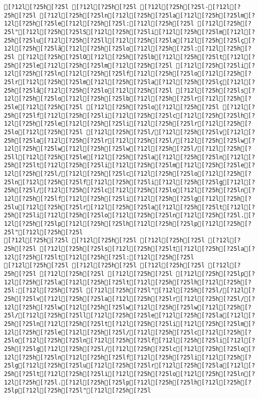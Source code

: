 \documentclass{scrartcl}
\begin{document}
\begin{Verbatim}
[?12l[?25h[?25l [?12l[?25h[?25l [?12l[?25h[?25l-[?12l[?25h[?25l [?12l[?25h[?25ln[?12l[?25h[?25la[?12l[?25h[?25lm[?12l[?25h[?25le[?12l[?25h[?25l:[?12l[?25h[?25l [?12l[?25h[?25l"[?12l[?25h[?25lS[?12l[?25h[?25li[?12l[?25h[?25lm[?12l[?25h[?25lu[?12l[?25h[?25ll[?12l[?25h[?25la[?12l[?25h[?25lç[?12l[?25h[?25lã[?12l[?25h[?25lo[?12l[?25h[?25l:[?12l[?25h[?25l [?12l[?25h[?25lO[?12l[?25h[?25lb[?12l[?25h[?25lt[?12l[?25h[?25le[?12l[?25h[?25lm[?12l[?25h[?25l [?12l[?25h[?25li[?12l[?25h[?25ln[?12l[?25h[?25lf[?12l[?25h[?25lo[?12l[?25h[?25lr[?12l[?25h[?25lm[?12l[?25h[?25la[?12l[?25h[?25lç[?12l[?25h[?25lã[?12l[?25h[?25lo[?12l[?25h[?25l [?12l[?25h[?25ls[?12l[?25h[?25lo[?12l[?25h[?25lb[?12l[?25h[?25lr[?12l[?25h[?25le[?12l[?25h[?25l [?12l[?25h[?25lo[?12l[?25h[?25l [?12l[?25h[?25lf[?12l[?25h[?25li[?12l[?25h[?25lc[?12l[?25h[?25lh[?12l[?25h[?25le[?12l[?25h[?25li[?12l[?25h[?25lr[?12l[?25h[?25lo[?12l[?25h[?25l [?12l[?25h[?25l/[?12l[?25h[?25lv[?12l[?25h[?25la[?12l[?25h[?25lr[?12l[?25h[?25l/[?12l[?25h[?25lw[?12l[?25h[?25lw[?12l[?25h[?25lw[?12l[?25h[?25l/[?12l[?25h[?25ll[?12l[?25h[?25le[?12l[?25h[?25la[?12l[?25h[?25ln[?12l[?25h[?25lt[?12l[?25h[?25li[?12l[?25h[?25lm[?12l[?25h[?25le[?12l[?25h[?25l/[?12l[?25h[?25lc[?12l[?25h[?25lo[?12l[?25h[?25ln[?12l[?25h[?25lf[?12l[?25h[?25li[?12l[?25h[?25lg[?12l[?25h[?25l/[?12l[?25h[?25lc[?12l[?25h[?25lo[?12l[?25h[?25ln[?12l[?25h[?25lf[?12l[?25h[?25li[?12l[?25h[?25lg[?12l[?25h[?25lu[?12l[?25h[?25lr[?12l[?25h[?25la[?12l[?25h[?25lt[?12l[?25h[?25li[?12l[?25h[?25lo[?12l[?25h[?25ln[?12l[?25h[?25l.[?12l[?25h[?25lp[?12l[?25h[?25lh[?12l[?25h[?25lp[?12l[?25h[?25l"[?12l[?25h[?25l
[?12l[?25h[?25l [?12l[?25h[?25l [?12l[?25h[?25l [?12l[?25h[?25l [?12l[?25h[?25ls[?12l[?25h[?25lt[?12l[?25h[?25la[?12l[?25h[?25lt[?12l[?25h[?25l:[?12l[?25h[?25l
[?12l[?25h[?25l [?12l[?25h[?25l [?12l[?25h[?25l [?12l[?25h[?25l [?12l[?25h[?25l [?12l[?25h[?25l [?12l[?25h[?25lp[?12l[?25h[?25la[?12l[?25h[?25lt[?12l[?25h[?25lh[?12l[?25h[?25l:[?12l[?25h[?25l [?12l[?25h[?25l"[?12l[?25h[?25l/[?12l[?25h[?25lv[?12l[?25h[?25la[?12l[?25h[?25lr[?12l[?25h[?25l/[?12l[?25h[?25lw[?12l[?25h[?25lw[?12l[?25h[?25lw[?12l[?25h[?25l/[?12l[?25h[?25ll[?12l[?25h[?25le[?12l[?25h[?25la[?12l[?25h[?25ln[?12l[?25h[?25lt[?12l[?25h[?25li[?12l[?25h[?25lm[?12l[?25h[?25le[?12l[?25h[?25l/[?12l[?25h[?25lc[?12l[?25h[?25lo[?12l[?25h[?25ln[?12l[?25h[?25lf[?12l[?25h[?25li[?12l[?25h[?25lg[?12l[?25h[?25l/[?12l[?25h[?25lc[?12l[?25h[?25lo[?12l[?25h[?25ln[?12l[?25h[?25lf[?12l[?25h[?25li[?12l[?25h[?25lg[?12l[?25h[?25lu[?12l[?25h[?25lr[?12l[?25h[?25la[?12l[?25h[?25lt[?12l[?25h[?25li[?12l[?25h[?25lo[?12l[?25h[?25ln[?12l[?25h[?25l.[?12l[?25h[?25lp[?12l[?25h[?25lh[?12l[?25h[?25lp[?12l[?25h[?25l"[?12l[?25h[?25l

\end{Verbatim}
\end{document}
